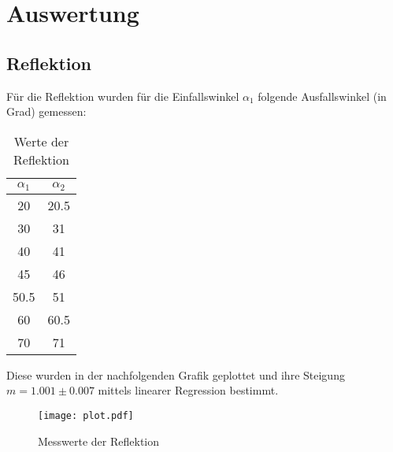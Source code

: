 \section{Auswertung}
\label{sec:Auswertung}

\subsection{Reflektion}
  Für die Reflektion wurden für die Einfallswinkel $\alpha_1$ folgende Ausfallswinkel (in Grad)
  gemessen:
  \begin{table}[H]
    \centering
    \caption{Werte der Reflektion}
    \begin{tabular}{c c}
      \toprule
      $\alpha_1$ & $\alpha_2$\\
      \midrule
        20 & 20.5\\
        30 & 31\\
        40 & 41\\
        45 & 46\\
        50.5 & 51\\
        60 & 60.5\\
        70 & 71\\
      \bottomrule
    \end{tabular}
  \end{table}
  \noindent Diese wurden in der nachfolgenden Grafik geplottet und ihre Steigung $m=1.001 \pm 0.007$
  mittels linearer Regression bestimmt.
  \begin{figure}[H]
    \centering
    \texttt{[image: plot.pdf]}
    \caption{Messwerte der Reflektion}
    \label{fig:plot}
  \end{figure}

